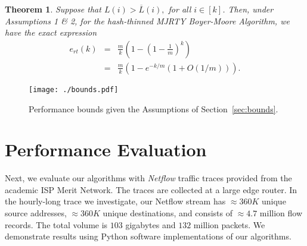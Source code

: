 \documentclass[10pt, conference, letterpaper,onecolumn]{IEEEtranv1.8}
\renewcommand\P{\mathbb P}
\newcommand\E{\mathbb E}
\theoremstyle{plain}\newtheorem{thm}{Theorem}\newtheorem{lem}{Lemma}
\theoremstyle{definition}
\def\HideProof#1{}
\begin{document}
\begin{thm} Suppose that $L(i) > \overline{L}(i),$ for all $i\in[k]$. Then, under Assumptions 1 \& 2, for the hash-thinned MJRTY
Boyer-Moore Algorithm, we have the exact expression
\begin{eqnarray}
\label{e:bm-expected}
e_{rt}(k) &=& \frac{m}{k} \left(1- \left(1-\frac{1}{m}\right)^k \right)\\
&=& \frac{m}{k} \left( 1-e^{-k/m}(1+O({1}/{m})) \right).\nonumber
\end{eqnarray}
\end{thm}
\HideProof{
\begin{proof} The assumption $L(i)> \overline L(i)$ guarantees that 
$N(k)$ equals the number of distinct values in the set of hashes $\{h(\omega_1),\cdots,h(\omega_k)\}$.
Let $Y_i = 1$ if bin $i$ is occupied and $0$ otherwise, for $i\in[m].$ Observe that
\begin{equation}\label{e:bm-expected-1}
\E N(k) = \sum_{i=1}^m \E Y_i = m \E Y_1,
\end{equation}
by exchangeability. Note, however, that 
$$
\E Y_1 = 1 - \P ( h(\omega_j) \not = 1,\ j\in[k]) = 1 - \left(1-\frac{1}{m} \right)^k,
$$
since $h(\omega_i),\ i\in[k]$ are independent and Uniform$([m])$.
This, in view of \eqref{e:e_r} and \eqref{e:bm-expected-1}, implies 
the first relation in \eqref{e:bm-expected}. The second follows from the standard
approximation $(1-1/m)^m \approx e^{-1}.$
\end{proof}}


\begin{figure}
         \vspace{-120pt}
        \centering
        \texttt{[image: ./bounds.pdf]}
         \vspace{-130pt}
        \caption{Performance bounds given the Assumptions of Section~\ref{sec:bounds}.}
        \label{fig:bounds}
 \end{figure}




\section{Performance Evaluation}

Next, we evaluate our algorithms with \emph{Netflow} traffic
traces provided from the academic ISP Merit Network. The traces are collected
at a large edge router. In the hourly-long trace we investigate,
our Netflow stream has $\approx360K$ unique source addresses, $\approx360K$
unique destinations, and consists of $\approx4.7$ million flow records.
The total volume is $103$ gigabytes and $132$ million packets.
We demonstrate results using Python software implementations
of our algorithms. 
\end{document}
